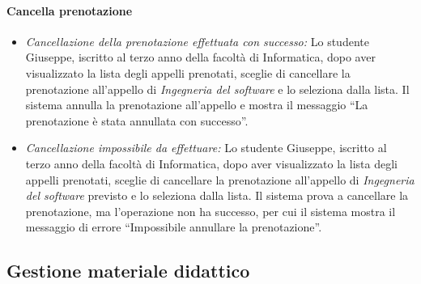 \paragraph{Cancella prenotazione}
\begin{itemize}
	\item \textit{Cancellazione della prenotazione effettuata con successo:}
	Lo studente Giuseppe, iscritto al terzo anno della facoltà di Informatica, dopo aver visualizzato la lista degli appelli prenotati, sceglie di cancellare la prenotazione all’appello di \textit{Ingegneria del software} e lo seleziona dalla lista. Il sistema annulla la prenotazione all’appello e mostra il messaggio “La prenotazione è stata annullata con successo”.
	
	\item \textit{Cancellazione impossibile da effettuare:}
	Lo studente Giuseppe, iscritto al terzo anno della facoltà di Informatica, dopo aver visualizzato la lista degli appelli prenotati, sceglie di cancellare la prenotazione all’appello di \textit{Ingegneria del software} previsto e lo seleziona dalla lista. Il sistema prova a cancellare la prenotazione, ma l’operazione non ha successo, per cui il sistema mostra il messaggio di errore “Impossibile annullare la prenotazione”.
\end{itemize}

\subsection{Gestione materiale didattico}
